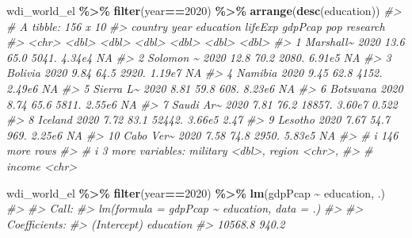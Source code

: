 \documentclass[
  xelatex, ja=standard]{bxjsbook}
\newenvironment{Shaded}{\begin{snugshade}}{\end{snugshade}}
\newcommand{\CommentTok}[1]{\textcolor[rgb]{0.56,0.35,0.01}{\textit{#1}}}
\newcommand{\DecValTok}[1]{\textcolor[rgb]{0.00,0.00,0.81}{#1}}
\newcommand{\FunctionTok}[1]{\textcolor[rgb]{0.13,0.29,0.53}{\textbf{#1}}}
\newcommand{\NormalTok}[1]{#1}
\newcommand{\SpecialCharTok}[1]{\textcolor[rgb]{0.81,0.36,0.00}{\textbf{#1}}}
\theoremstyle{definition}
\theoremstyle{definition}
\theoremstyle{definition}
\theoremstyle{definition}
\theoremstyle{remark}
\begin{document}
\begin{Shaded}
\begin{Highlighting}[]
\NormalTok{wdi\_world\_el }\SpecialCharTok{\%\textgreater{}\%} \FunctionTok{filter}\NormalTok{(year}\SpecialCharTok{==}\DecValTok{2020}\NormalTok{) }\SpecialCharTok{\%\textgreater{}\%} \FunctionTok{arrange}\NormalTok{(}\FunctionTok{desc}\NormalTok{(education))}
\CommentTok{\#\textgreater{} \# A tibble: 156 x 10}
\CommentTok{\#\textgreater{}    country    year education lifeExp gdpPcap    pop research}
\CommentTok{\#\textgreater{}    \textless{}chr\textgreater{}     \textless{}dbl\textgreater{}     \textless{}dbl\textgreater{}   \textless{}dbl\textgreater{}   \textless{}dbl\textgreater{}  \textless{}dbl\textgreater{}    \textless{}dbl\textgreater{}}
\CommentTok{\#\textgreater{}  1 Marshall\textasciitilde{}  2020     13.6     65.0   5041. 4.34e4   NA    }
\CommentTok{\#\textgreater{}  2 Solomon \textasciitilde{}  2020     12.8     70.2   2080. 6.91e5   NA    }
\CommentTok{\#\textgreater{}  3 Bolivia    2020      9.84    64.5   2920. 1.19e7   NA    }
\CommentTok{\#\textgreater{}  4 Namibia    2020      9.45    62.8   4152. 2.49e6   NA    }
\CommentTok{\#\textgreater{}  5 Sierra L\textasciitilde{}  2020      8.81    59.8    608. 8.23e6   NA    }
\CommentTok{\#\textgreater{}  6 Botswana   2020      8.74    65.6   5811. 2.55e6   NA    }
\CommentTok{\#\textgreater{}  7 Saudi Ar\textasciitilde{}  2020      7.81    76.2  18857. 3.60e7    0.522}
\CommentTok{\#\textgreater{}  8 Iceland    2020      7.72    83.1  52442. 3.66e5    2.47 }
\CommentTok{\#\textgreater{}  9 Lesotho    2020      7.67    54.7    969. 2.25e6   NA    }
\CommentTok{\#\textgreater{} 10 Cabo Ver\textasciitilde{}  2020      7.58    74.8   2950. 5.83e5   NA    }
\CommentTok{\#\textgreater{} \# i 146 more rows}
\CommentTok{\#\textgreater{} \# i 3 more variables: military \textless{}dbl\textgreater{}, region \textless{}chr\textgreater{},}
\CommentTok{\#\textgreater{} \#   income \textless{}chr\textgreater{}}
\end{Highlighting}
\end{Shaded}

\begin{Shaded}
\begin{Highlighting}[]
\NormalTok{wdi\_world\_el }\SpecialCharTok{\%\textgreater{}\%} \FunctionTok{filter}\NormalTok{(year}\SpecialCharTok{==}\DecValTok{2020}\NormalTok{) }\SpecialCharTok{\%\textgreater{}\%} \FunctionTok{lm}\NormalTok{(gdpPcap }\SpecialCharTok{\textasciitilde{}}\NormalTok{ education, .)}
\CommentTok{\#\textgreater{} }
\CommentTok{\#\textgreater{} Call:}
\CommentTok{\#\textgreater{} lm(formula = gdpPcap \textasciitilde{} education, data = .)}
\CommentTok{\#\textgreater{} }
\CommentTok{\#\textgreater{} Coefficients:}
\CommentTok{\#\textgreater{} (Intercept)    education  }
\CommentTok{\#\textgreater{}     10568.8        940.2}
\end{Highlighting}
\end{Shaded}
\end{document}
